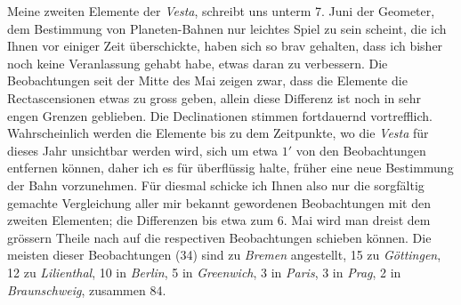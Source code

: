 \par\indent Meine zweiten Elemente der \emph{Vesta}, schreibt uns unterm 7. Juni der Geometer, dem Bestimmung von Planeten-Bahnen nur leichtes Spiel zu sein scheint, die ich Ihnen vor einiger Zeit überschickte, haben sich so brav gehalten, dass ich bisher noch keine Veranlassung gehabt habe, etwas daran zu verbessern. Die Beobachtungen seit der Mitte des Mai zeigen zwar, dass die Elemente die Rectascensionen etwas zu gross geben, allein diese Differenz ist noch in sehr engen Grenzen geblieben. Die Declinationen stimmen fortdauernd vortrefflich. Wahrscheinlich werden die Elemente bis zu dem Zeitpunkte, wo die \emph{Vesta} für dieses Jahr unsichtbar werden wird, sich um etwa $1'$ von den Beobachtungen entfernen können, daher ich es für überflüssig halte, früher eine neue Bestimmung der Bahn vorzunehmen. Für diesmal schicke ich Ihnen also nur die sorgfältig gemachte Vergleichung aller mir bekannt gewordenen Beobachtungen mit den zweiten Elementen; die Differenzen bis etwa zum 6. Mai wird man dreist dem grössern Theile nach auf die respectiven Beobachtungen schieben können. Die meisten dieser Beobachtungen (34) sind zu \emph{Bremen} angestellt, 15 zu \emph{Göttingen}, 12 zu \emph{Lilienthal}, 10 in \emph{Berlin}, 5 in \emph{Greenwich}, 3 in \emph{Paris}, 3 in \emph{Prag}, 2 in \emph{Braunschweig}, zusammen 84.
\clearpage
\begingroup
\fontsize{9}{11}\selectfont
\setlength{\tabcolsep}{2.5pt}\renewcommand{\arraystretch}{1.10}
